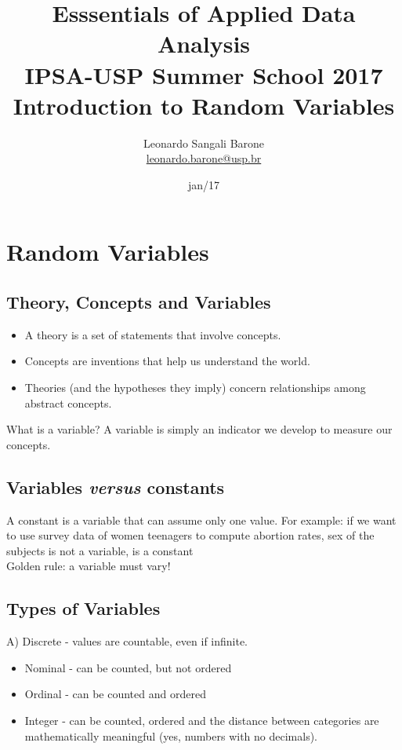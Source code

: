 \documentclass[11pt]{article}
\title{\textbf{Esssentials of Applied Data Analysis\\
				IPSA-USP Summer School 2017}\newline\\
				Introduction to Random Variables}
\author{Leonardo Sangali Barone\\ \href{leonardo.barone@usp.br}{leonardo.barone@usp.br}}
\date{jan/17}
\begin{document}
\maketitle

\section*{Random Variables}

	\subsection*{Theory, Concepts and Variables}

	\begin{itemize}

	\item A theory is a set of statements that involve concepts.
	\item Concepts are inventions that help us understand the world.
	\item Theories (and the hypotheses they imply) concern relationships among abstract concepts.
	\end{itemize}
	What is a variable? A variable is simply an indicator we develop to measure our concepts.


	\subsection*{Variables \emph{versus} constants}
	A constant is a variable that can assume only one value. For example: if we want to use survey data of women teenagers to compute abortion rates, sex of the subjects is not a variable, is a constant\\
	
	Golden rule: a variable must vary!

	\subsection*{Types of Variables}
	
	A) Discrete - values are countable, even if infinite.
	
	\begin{itemize}
		\item Nominal - can be counted, but not ordered
		\item Ordinal - can be counted and ordered
		\item Integer - can be counted, ordered and the distance between categories are mathematically meaningful (yes, numbers with no decimals).
	\end{itemize}
	
\end{document}

